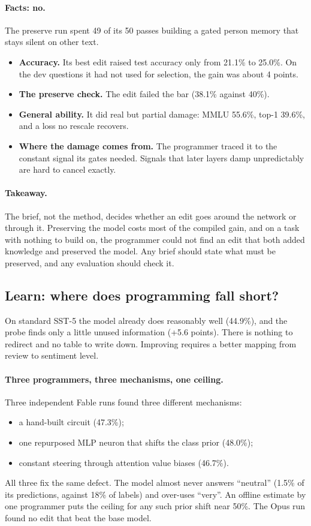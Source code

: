\paragraph{Facts: no.} The preserve run spent 49 of its 50 passes building a gated person memory that stays silent on other text.
\begin{itemize}
  \item \textbf{Accuracy.} Its best edit raised test accuracy only from 21.1\% to 25.0\%. On the dev questions it had not used for selection, the gain was about 4 points.
  \item \textbf{The preserve check.} The edit failed the bar (38.1\% against 40\%).
  \item \textbf{General ability.} It did real but partial damage: MMLU 55.6\%, top-1 39.6\%, and a loss no rescale recovers.
  \item \textbf{Where the damage comes from.} The programmer traced it to the constant signal its gates needed. Signals that later layers damp unpredictably are hard to cancel exactly.
\end{itemize}

\paragraph{Takeaway.} The brief, not the method, decides whether an edit goes around the network or through it. Preserving the model costs most of the compiled gain, and on a task with nothing to build on, the programmer could not find an edit that both added knowledge and preserved the model. Any brief should state what must be preserved, and any evaluation should check it.

\subsection{Learn: where does programming fall short?}
\label{sec:learn}
On standard SST-5 the model already does reasonably well (44.9\%), and the probe finds only a little unused information (+5.6 points). There is nothing to redirect and no table to write down. Improving requires a better mapping from review to sentiment level.

\paragraph{Three programmers, three mechanisms, one ceiling.} Three independent Fable runs found three different mechanisms:
\begin{itemize}
  \item a hand-built circuit (47.3\%);
  \item one repurposed MLP neuron that shifts the class prior (48.0\%);
  \item constant steering through attention value biases (46.7\%).
\end{itemize}
All three fix the same defect. The model almost never answers ``neutral'' (1.5\% of its predictions, against 18\% of labels) and over-uses ``very''. An offline estimate by one programmer puts the ceiling for any such prior shift near 50\%. The Opus run found no edit that beat the base model.

